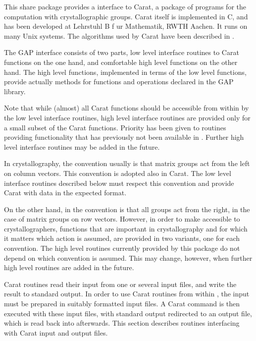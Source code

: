 
This share package provides a {\GAP} interface to Carat, 
a package of programs for the computation with crystallographic 
groups. Carat itself is implemented in C, and has been developed at 
Lehrstuhl B f{ u}r Mathematik, RWTH Aachen. It runs on many 
Unix systems. The algorithms used by Carat have been described in
\cite{OPS}.

The {GAP} interface consists of two parts, low level interface 
routines to Carat functions on the one hand, and comfortable high 
level {\GAP} functions on the other hand. The high level functions,
implemented in terms of the low level functions, provide actually
methods for functions and operations declared in the {GAP} library.

Note that while (almost) all Carat functions should be accessible
from within {\GAP} by the low level interface routines, high level
interface routines are provided only for a small subset of the
Carat functions. Priority has been given to routines providing
functionality that has previously not been available in {\GAP}.
Further high level interface routines may be added in the future.


In crystallography, the convention usually is that matrix groups
act from the left on column vectors. This convention is adopted
also in Carat. The low level interface routines described below
must respect this convention and provide Carat with data in the 
expected format.

On the other hand, in {\GAP} the convention is that all groups 
act from the right, in the case of matrix groups on row vectors. 
However, in order to make {\GAP} accessible to crystallographers,
functions that are important in crystallography and for which it
matters which action is assumed, are provided in two variants, 
one for each convention. The high level routines currently provided
by this package do not depend on which convention is assumed.
This may change, however, when further high level routines are 
added in the future.


Carat routines read their input from one or several input files,
and write the result to standard output. In order to use Carat
routines from within {\GAP}, the input must be prepared in suitably
formatted input files. A Carat command is then executed with these
input files, with standard output redirected to an output file, 
which is read back into {\GAP} afterwards. This section describes
routines interfacing with Carat input and output files.


